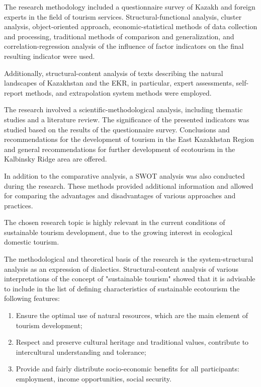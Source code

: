 The research methodology included a questionnaire survey of Kazakh and
foreign experts in the field of tourism services. Structural-functional
analysis, cluster analysis, object-oriented approach,
economic-statistical methods of data collection and processing,
traditional methods of comparison and generalization, and
correlation-regression analysis of the influence of factor indicators on
the final resulting indicator were used.

Additionally, structural-content analysis of texts describing the
natural landscapes of Kazakhstan and the EKR, in particular, expert
assessments, self-report methods, and extrapolation system methods were
employed.

The research involved a scientific-methodological analysis, including
thematic studies and a literature review. The significance of the
presented indicators was studied based on the results of the
questionnaire survey. Conclusions and recommendations for the
development of tourism in the East Kazakhstan Region and general
recommendations for further development of ecotourism in the Kalbinsky
Ridge area are offered.

In addition to the comparative analysis, a SWOT analysis was also
conducted during the research. These methods provided additional
information and allowed for comparing the advantages and disadvantages
of various approaches and practices.

The chosen research topic is highly relevant in the current conditions
of sustainable tourism development, due to the growing interest in
ecological domestic tourism.

The methodological and theoretical basis of the research is the
system-structural analysis as an expression of dialectics.
Structural-content analysis of various interpretations of the concept of
"sustainable tourism" showed that it is advisable to include in the list
of defining characteristics of sustainable ecotourism the following
features:

\begin{enumerate}
\def\labelenumi{\arabic{enumi})}
\item
  Ensure the optimal use of natural resources, which are the main
  element of tourism development;
\item
  Respect and preserve cultural heritage and traditional values,
  contribute to intercultural understanding and tolerance;
\item
  Provide and fairly distribute socio-economic benefits for all
  participants: employment, income opportunities, social security.
\end{enumerate}

